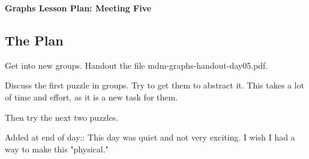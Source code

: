\documentclass[12pt]{amsart}
\theoremstyle{definition}
\begin{document}
\begin{center}
\textbf{\Huge
Graphs Lesson Plan: Meeting Five
}
\end{center}
\vspace{.5in}


\subsection*{The Plan}

Get into new groups.  Handout the file mdm-graphs-handout-day05.pdf. 

Discuss the first puzzle in groups. Try to get them to abstract it. This takes a lot of time and effort, as it
is a new task for them.

Then try the next two puzzles.

Added at end of day:: This day was quiet and not very exciting. I wish I had a way to make this "physical."
\end{document}
